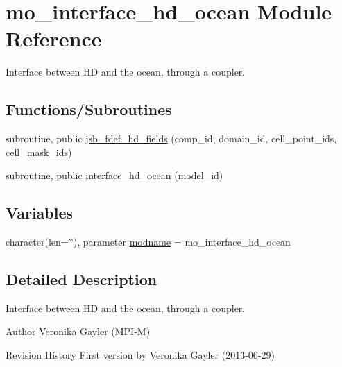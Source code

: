 \hypertarget{namespacemo__interface__hd__ocean}{}\section{mo\+\_\+interface\+\_\+hd\+\_\+ocean Module Reference}
\label{namespacemo__interface__hd__ocean}


Interface between H\+D and the ocean, through a coupler.  


\subsection*{Functions/\+Subroutines}
\begin{DoxyCompactItemize}
\item 
subroutine, public \hyperlink{namespacemo__interface__hd__ocean_aae89e81e8ed8ff0ac60174e3e3401fc3}{jsb\+\_\+fdef\+\_\+hd\+\_\+fields} (comp\+\_\+id, domain\+\_\+id, cell\+\_\+point\+\_\+ids, cell\+\_\+mask\+\_\+ids)
\item 
subroutine, public \hyperlink{namespacemo__interface__hd__ocean_a40fcf1b57ea23f20ee39471869865086}{interface\+\_\+hd\+\_\+ocean} (model\+\_\+id)
\end{DoxyCompactItemize}
\subsection*{Variables}
\begin{DoxyCompactItemize}
\item 
character(len=$\ast$), parameter \hyperlink{namespacemo__interface__hd__ocean_a4263037e844d6da838dd6086322fc107}{modname} = \textquotesingle{}mo\+\_\+interface\+\_\+hd\+\_\+ocean\textquotesingle{}
\end{DoxyCompactItemize}


\subsection{Detailed Description}
Interface between H\+D and the ocean, through a coupler. 

\begin{DoxyAuthor}{Author}
Veronika Gayler (M\+P\+I-\/\+M)
\end{DoxyAuthor}
\begin{DoxyParagraph}{Revision History}
First version by Veronika Gayler (2013-\/06-\/29) 
\end{DoxyParagraph}


